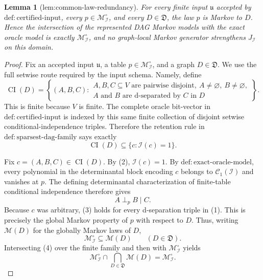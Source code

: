 \documentclass{article}
\newtheorem{lemma}{Lemma}
\begin{document}
\begin{lemma}[lem:common-law-redundancy]\label{lem:common-law-redundancy}
For every finite input \(\mathfrak u\) accepted by \(\mathrm{def{:}certified\text{-}input}\), every \(p\in\mathcal M_{\mathcal I}^{\circ}\), and every \(D\in\mathfrak D\), the law \(p\) is Markov to \(D\). Hence the intersection of the represented DAG Markov models with the exact oracle model is exactly \(\mathcal M_{\mathcal I}^{\circ}\), and no graph-local Markov generator strengthens \(J_{\mathcal I}\) on this domain.
\end{lemma}
\begin{proof}
Fix an accepted input \(\mathfrak u\), a table \(p\in\mathcal M_{\mathcal I}^{\circ}\), and a graph \(D\in\mathfrak D\).  We use the full setwise route required by the input schema.  Namely, define
\[
 \operatorname{CI}(D)
 =\left\{(A,B,C):
 \begin{array}{l}
 A,B,C\subseteq V\text{ are pairwise disjoint},\ A\neq\varnothing,\ B\neq\varnothing,\\
 A\text{ and }B\text{ are d-separated by }C\text{ in }D
 \end{array}
 \right\}. \tag{1}
\]
This is finite because \(V\) is finite.  The complete oracle bit-vector in \(\mathrm{def{:}certified\text{-}input}\) is indexed by this same finite collection of disjoint setwise conditional-independence triples.  Therefore the retention rule in \(\mathrm{def{:}sparsest\text{-}dag\text{-}family}\) says exactly
\[
 \operatorname{CI}(D)\subseteq\{c:\mathcal I(c)=1\}. \tag{2}
\]

Fix \(c=(A,B,C)\in\operatorname{CI}(D)\).  By (2), \(\mathcal I(c)=1\).  By \(\mathrm{def{:}exact\text{-}oracle\text{-}model}\), every polynomial in the determinantal block encoding \(c\) belongs to \(\mathcal C_1(\mathcal I)\) and vanishes at \(p\).  The defining determinantal characterization of finite-table conditional independence therefore gives
\[
 A\perp_p B\mid C. \tag{3}
\]
Because \(c\) was arbitrary, (3) holds for every d-separation triple in (1).  This is precisely the global Markov property of \(p\) with respect to \(D\).  Thus, writing \(\mathcal M(D)\) for the globally Markov laws of \(D\),
\[
 \mathcal M_{\mathcal I}^{\circ}
 \subseteq \mathcal M(D)
 \qquad(D\in\mathfrak D). \tag{4}
\]
Intersecting (4) over the finite family and then with \(\mathcal M_{\mathcal I}^{\circ}\) yields
\[
 \mathcal M_{\mathcal I}^{\circ}\cap
 \bigcap_{D\in\mathfrak D}\mathcal M(D)
 =\mathcal M_{\mathcal I}^{\circ}. \tag{5}
\]


\end{proof}
\end{document}

